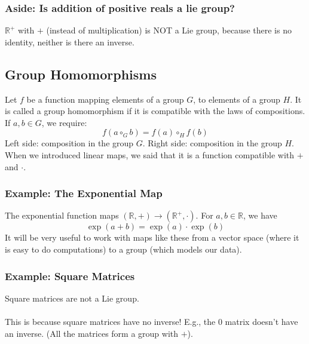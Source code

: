 \documentclass[10pt]{article}
\newcommand{\R}{\mathbb{R}}
\begin{document}
\subsubsection*{Aside: Is addition of positive reals a lie group?}
$\R^+$ with $+$ (instead of multiplication) is NOT a Lie group, because there is no identity, neither is there an inverse.

\subsection*{Group Homomorphisms}
Let $f$ be a function mapping elements of a group $G$, to elements of a group $H$.  It is called a group homomorphism if it is compatible with the laws of compositions.  If $a, b \in G$, we require:
\[f(a \circ_G b) = f(a) \circ_H f(b)\]
Left side: composition in the group $G$.  Right side: composition in the group $H$.
When we introduced linear maps, we said that it is a function compatible with $+$ and $\cdot$.

\subsubsection*{Example: The Exponential Map}
The exponential function maps $(\R, +) \rightarrow (\R^{+}, \cdot)$.  For $a, b \in \R$, we have
\[\exp(a + b) = \exp(a) \cdot \exp(b)\]
It will be very useful to work with maps like these from a vector space (where it is easy to do computations) to a group (which models our data).

\subsubsection*{Example: Square Matrices}
Square matrices are not a Lie group.\\\\
This is because square matrices have no inverse!  E.g., the 0 matrix doesn't have an inverse.  (All the matrices form a group with $+$).
\end{document}
